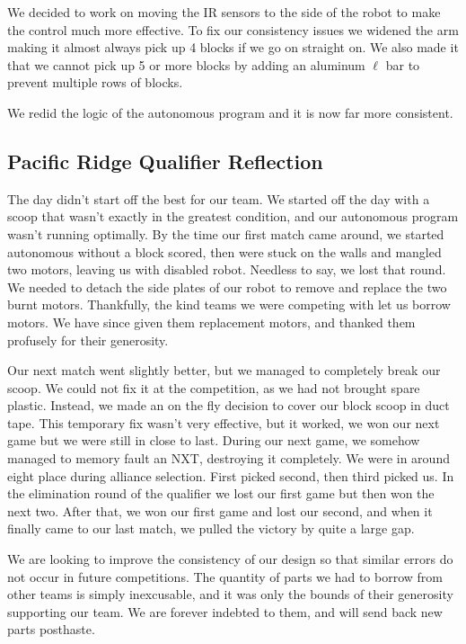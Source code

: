 We decided to work on moving the IR sensors to the side of the robot to make the control much more effective. To fix our consistency issues we widened the arm making it almost always pick up 4 blocks if we go on straight on. We also made it that we cannot pick up 5 or more blocks by adding an aluminum $\ell$ bar to prevent multiple rows of blocks.

We redid the logic of the autonomous program and it is now far more consistent.

\newpage \subsection{Pacific Ridge Qualifier Reflection}
The day didn't start off the best for our team. We started off the day with a scoop that wasn't exactly in the greatest condition, and our autonomous program wasn’t running optimally. By the time our first match came around, we started autonomous without a block scored, then were stuck on the walls and mangled two motors, leaving us with disabled robot. Needless to say, we lost that round. We needed to detach the side plates of our robot to remove and replace the two burnt motors. Thankfully, the kind teams we were competing with let us borrow motors. We have since given them replacement motors, and thanked them profusely for their generosity. 

Our next match went slightly better, but we managed to completely break our scoop. We could not fix it at the competition, as we had not brought spare plastic. Instead, we made an on the fly decision to cover our block scoop in duct tape. This temporary fix wasn’t very effective, but it worked, we won our next game but we were still in close to last. During our next game, we somehow managed to memory fault an NXT, destroying it completely. We were in around eight place during alliance selection. First picked second, then third picked us. In the elimination round of the qualifier we lost our first game but then won the next two. After that, we won our first game and lost our second, and when it finally came to our last match, we pulled the victory by quite a large gap.

We are looking to improve the consistency of our design so that similar errors do not occur in future competitions. The quantity of parts we had to borrow from other teams is simply inexcusable, and it was only the bounds of their generosity supporting our team. We are forever indebted to them, and will send back new parts posthaste.


